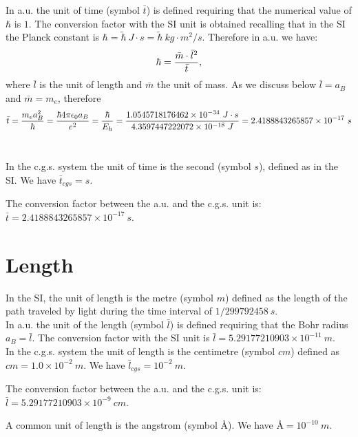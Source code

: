 \documentclass[12pt,a4paper]{article}
\def\hbarf{1.0545718176462\times 10^{-34}}
\def\barl{5.29177210903\times 10^{-11}}
\def\bart{2.4188843265857\times 10^{-17}}
\def\baru{4.3597447222072\times 10^{-18}}
\def\cmtom{1.0\times 10^{-2}}
\def\barlcgs{5.29177210903\times 10^{-9}}
\begin{document}
{\color{web-blue} In a.u. the unit of time (symbol $\bar t$) is 
defined requiring that the numerical value of $\hbar$ is $1$.
The conversion factor with the SI unit is obtained recalling that in the 
SI the Planck constant 
is $\hbar= \tilde \hbar\ J\cdot s=\tilde \hbar\ kg\cdot m^2 / s$. 
Therefore in a.u. we have: 
\begin{equation}
\hbar = {\bar m \cdot \bar l^2 \over \bar t},
\end{equation}
where $\bar l$ is the unit of length and $\bar m$ the unit of mass.
As we discuss below $\bar l=a_B$ and $\bar m=m_e$, therefore
\begin{equation}
\bar t = {m_e a_B^2 \over \hbar} = 
{\hbar 4 \pi \epsilon_0 a_B \over e^2}
={\hbar \over E_h}= {\hbarf\ J\cdot s \over \baru\ J}=
\bart\ s
\end{equation}
\\
}

{\color{orange} In the c.g.s. system the unit of time 
is the second (symbol $s$), defined as in the SI. We have $\bar t_{cgs}=s$.
\\
}

{\color{green} The conversion factor between the a.u. and the c.g.s. unit is:
${\bar t}=\bart\ s$.
}

\newpage

\section{\color{coral}Length}
In the SI, the unit of length is the metre (symbol $m$) defined
as the length of the path traveled by light during the time interval
of $1/299792458\ s$.
\\

{\color{web-blue} In a.u. the unit of the length (symbol $\bar l$) is defined
requiring that the Bohr radius $a_B= \bar l$. The conversion factor with the
SI unit is $\bar l = \barl\ m$.}
\\

{\color{orange} In the c.g.s. system the unit of length is the centimetre 
(symbol $cm$) defined as $cm =\cmtom\ m$. We have $\bar l_{cgs}=10^{-2}\ m$.
\\
}

{\color{green} The conversion factor between the a.u. and the c.g.s. unit is:
${\bar l}=\barlcgs\ cm$.
\\
}

{\color{red} A common unit of length is the angstrom (symbol \AA).
We have \AA$=10^{-10}\ m$.
}
\end{document}
